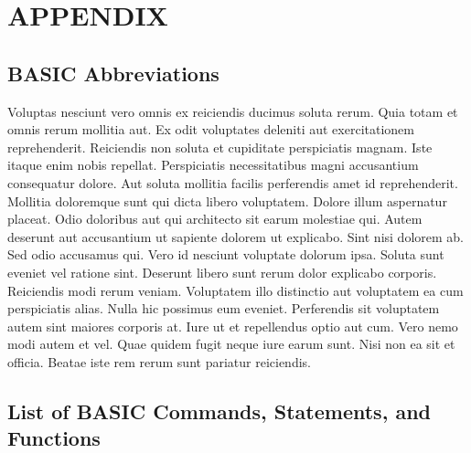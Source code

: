 \documentclass[
	11pt, %
	fleqn, %
	letterpaper, %
]{CommodoreBlueBook}
\begin{document}
\cleardoublepage



\cleardoublepage

\makeatletter\@openrightfalse
\part{APPENDIX}

\chapter*{BASIC Abbreviations}

Voluptas nesciunt vero omnis ex reiciendis ducimus soluta rerum. Quia totam et
omnis rerum mollitia aut. Ex odit voluptates deleniti aut exercitationem
reprehenderit. Reiciendis non soluta et cupiditate perspiciatis magnam. Iste
itaque enim nobis repellat. Perspiciatis necessitatibus magni accusantium
consequatur dolore. Aut soluta mollitia facilis perferendis amet id
reprehenderit. Mollitia doloremque sunt qui dicta libero voluptatem. Dolore
illum aspernatur placeat. Odio doloribus aut qui architecto sit earum molestiae
qui. Autem deserunt aut accusantium ut sapiente dolorem ut explicabo. Sint nisi
dolorem ab. Sed odio accusamus qui. Vero id nesciunt voluptate dolorum ipsa.
Soluta sunt eveniet vel ratione sint. Deserunt libero sunt rerum dolor
explicabo corporis. Reiciendis modi rerum veniam. Voluptatem illo distinctio
aut voluptatem ea cum perspiciatis alias. Nulla hic possimus eum eveniet.
Perferendis sit voluptatem autem sint maiores corporis at. Iure ut et
repellendus optio aut cum. Vero nemo modi autem et vel. Quae quidem fugit neque
iure earum sunt. Nisi non ea sit et officia. Beatae iste rem rerum sunt
pariatur reiciendis.

\chapter*{List of BASIC Commands, Statements, and Functions}
\end{document}
